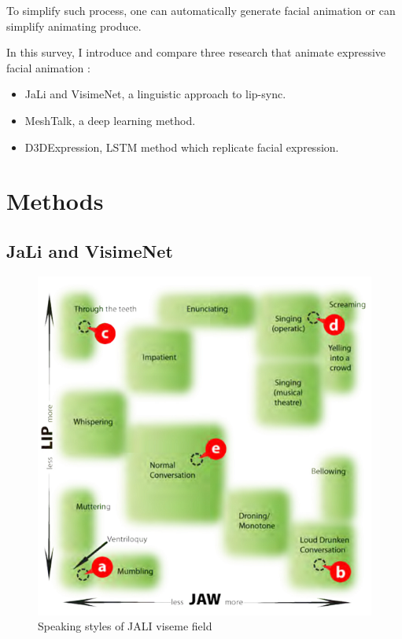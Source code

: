 \documentclass[10pt,twocolumn,letterpaper]{article}
\begin{document}
To simplify such process, one can automatically generate facial animation or can simplify animating produce.

In this survey, I introduce and compare three research that animate expressive facial animation :
\begin{itemize}
 \item JaLi\cite{edwardsJALIAnimatorcentricViseme2016} and VisimeNet\cite{zhouVisemenetAudiodrivenAnimatorcentric2018}, a linguistic approach to lip-sync.
 \item MeshTalk\cite{richardMeshTalk3DFace2021}, a deep learning method.
 \item D3DExpression\cite{potamiasLearningGenerateCustomized2020}, LSTM method which replicate facial expression.
\end{itemize}






\section{Methods}

\subsection{JaLi and VisimeNet}

\begin{figure}
   \includegraphics{jaliStyles} 
   \caption{Speaking styles of JALI viseme field}
   \label{fig:jaliStyles}
\end{figure}
\end{document}
